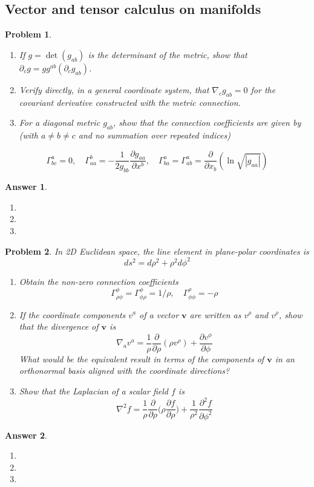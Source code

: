 \documentclass[a4paper]{article}
\newtheorem{ans}{Answer}[subsection]
\theoremstyle{new}
\newtheorem{qns}{Problem}[section]
\begin{document}
\subsection*{Vector and tensor calculus on manifolds}
\begin{qns}\leavevmode
\begin{enumerate}[label=(\alph*)]
\item  If $g = \det(g_{ab})$ is the determinant of the metric, show that $\partial_cg = gg^{ab}(\partial_cg_{ab})$.
\item Verify directly, in a general coordinate system, that $\nabla_cg_{ab} = 0$ for the covariant derivative constructed with the metric connection.
\item For a diagonal metric $g_{ab}$, show
that the connection coefficients are given by (with $a\neq b\neq c$ and no summation over
repeated indices)
\end{enumerate}
$$\Gamma_{bc}^a=0,\quad\Gamma_{aa}^b=-\frac{1}{2g_{bb}}\frac{\partial g_{aa}}{\partial x^b},\quad\Gamma_{ba}^a=\Gamma_{ab}^a=\frac{\partial}{\partial x_b}(\ln\sqrt{|g_{aa}|})$$
\end{qns}
\begin{ans}\leavevmode
\begin{enumerate}[label=(\alph*)]
\item

\item 

\item 
\end{enumerate}
\end{ans}
\begin{qns}
In 2D Euclidean space, the line element in plane-polar coordinates is
$$ds^2=d\rho^2+\rho^2d\phi^2$$
\begin{enumerate}[label=(\alph*)]
\item Obtain the non-zero connection coefficients
$$\Gamma_{\rho\phi}^\phi=\Gamma_{\phi\rho}^\phi=1/\rho,\quad\Gamma_{\phi\phi}^\rho=-\rho$$
\item If the coordinate components $v^a$ of a vector $\mathbf{v}$ are written as $v^\rho$ and $v^\rho$, show that the divergence of $\mathbf{v}$ is
$$\nabla_av^a=\frac{1}{\rho}\frac{\partial}{\partial\rho}(\rho v^\rho)+\frac{\partial v^\phi}{\partial\phi}$$
What would be the equivalent result in terms of the components of $\mathbf{v}$ in an orthonormal basis aligned with the coordinate directions?
\item Show that the Laplacian of a scalar field $f$ is
$$\nabla^2f=\frac{1}{\rho}\frac{\partial}{\partial\rho}\bigg(\rho\frac{\partial f}{\partial\rho}\bigg)+\frac{1}{\rho^2}\frac{\partial^2f}{\partial\phi^2}$$

\end{enumerate}
\end{qns}
\begin{ans}\leavevmode
\begin{enumerate}[label=(\alph*)]
\item

\item 
\item 
\end{enumerate}
\end{ans}
\end{document}
